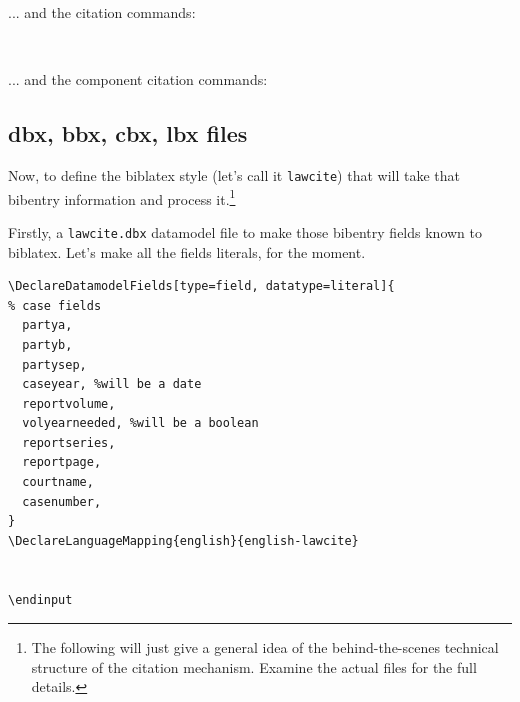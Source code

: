 
... and the citation commands:
\bigskip


 \hfill\pointing\ 



\bigskip

... and the component citation commands:%
\bigskip








\newpage


\subsection{dbx, bbx, cbx, lbx files}

Now, to define the biblatex style (let's call it \verb|lawcite|) that will take that bibentry information and process it.\footnote{The following will just give a general idea of the behind-the-scenes technical structure of the citation mechanism. Examine the actual files for the full details.}
\bigskip

Firstly, a \verb|lawcite.dbx| datamodel file  to make those bibentry fields known to biblatex. Let's make all the fields literals, for the moment.

\begin{verbatim}
\DeclareDatamodelFields[type=field, datatype=literal]{
% case fields
  partya, 
  partyb,
  partysep,
  caseyear, %will be a date
  reportvolume,
  volyearneeded, %will be a boolean
  reportseries,
  reportpage,
  courtname,
  casenumber,
}
\DeclareLanguageMapping{english}{english-lawcite}


\endinput

\end{verbatim}

